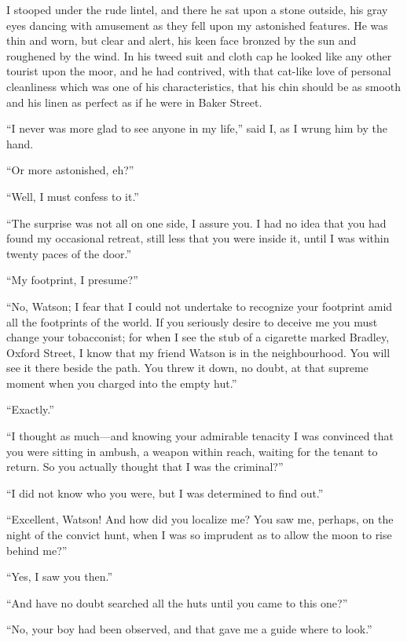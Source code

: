 \documentclass[paper=a5,BCOR=7mm,twoside,DIV=calc,12pt,usegeometry,openany,chapterprefix,endperiod,headings=big]{scrbook} %
\begin{document}
I stooped under the rude lintel, and there he sat upon a stone outside, his gray eyes dancing with amusement as they fell upon my astonished features. He was thin and worn, but clear and alert, his keen face bronzed by the sun and roughened by the wind. In his tweed suit and cloth cap he looked like any other tourist upon the moor, and he had contrived, with that cat-like love of personal cleanliness which was one of his characteristics, that his chin should be as smooth and his linen as perfect as if he were in Baker Street.



\enquote{I never was more glad to see anyone in my life,} said I, as I wrung him by the hand.

\enquote{Or more astonished, eh?}

\enquote{Well, I must confess to it.}

\enquote{The surprise was not all on one side, I assure you. I had no idea that you had found my occasional retreat, still less that you were inside it, until I was within twenty paces of the door.}

\enquote{My footprint, I presume?}

\enquote{No, Watson; I fear that I could not undertake to recognize your footprint amid all the footprints of the world. If you seriously desire to deceive me you must change your tobacconist; for when I see the stub of a cigarette marked Bradley, Oxford Street, I know that my friend Watson is in the neighbourhood. You will see it there beside the path. You threw it down, no doubt, at that supreme moment when you charged into the empty hut.}

\enquote{Exactly.}

\enquote{I thought as much---and knowing your admirable tenacity I was convinced that you were sitting in ambush, a weapon within reach, waiting for the tenant to return. So you actually thought that I was the criminal?}

\enquote{I did not know who you were, but I was determined to find out.}

\enquote{Excellent, Watson! And how did you localize me? You saw me, perhaps, on the night of the convict hunt, when I was so imprudent as to allow the moon to rise behind me?}

\enquote{Yes, I saw you then.}

\enquote{And have no doubt searched all the huts until you came to this one?}

\enquote{No, your boy had been observed, and that gave me a guide where to look.}
\end{document}
